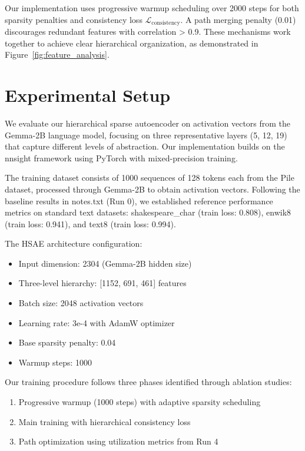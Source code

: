\documentclass{article} %
\begin{document}
Our implementation uses progressive warmup scheduling over 2000 steps for both sparsity penalties and consistency loss $\mathcal{L}_\text{consistency}$. A path merging penalty (0.01) discourages redundant features with correlation > 0.9. These mechanisms work together to achieve clear hierarchical organization, as demonstrated in Figure~\ref{fig:feature_analysis}.

\section{Experimental Setup}
\label{sec:experimental}

We evaluate our hierarchical sparse autoencoder on activation vectors from the Gemma-2B language model, focusing on three representative layers (5, 12, 19) that capture different levels of abstraction. Our implementation builds on the nnsight framework \cite{karpathy2023nanogpt} using PyTorch with mixed-precision training.

The training dataset consists of 1000 sequences of 128 tokens each from the Pile dataset, processed through Gemma-2B to obtain activation vectors. Following the baseline results in notes.txt (Run 0), we established reference performance metrics on standard text datasets: shakespeare\_char (train loss: 0.808), enwik8 (train loss: 0.941), and text8 (train loss: 0.994).

The HSAE architecture configuration:
\begin{itemize}
    \item Input dimension: 2304 (Gemma-2B hidden size)
    \item Three-level hierarchy: [1152, 691, 461] features
    \item Batch size: 2048 activation vectors
    \item Learning rate: 3e-4 with AdamW optimizer
    \item Base sparsity penalty: 0.04
    \item Warmup steps: 1000
\end{itemize}

Our training procedure follows three phases identified through ablation studies:
\begin{enumerate}
    \item Progressive warmup (1000 steps) with adaptive sparsity scheduling
    \item Main training with hierarchical consistency loss
    \item Path optimization using utilization metrics from Run 4
\end{enumerate}
\end{document}
